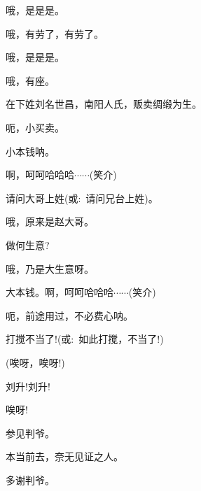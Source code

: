 {{哦，是是是。}

{哦，有劳了，有劳了。}

{哦，是是是。}

{哦，有座。}

{在下姓刘名世昌，南阳人氏，贩卖绸缎为生。}

{呃，小买卖。}

{小本钱呐。}

{啊，呵呵哈哈哈$\cdots{}\cdots{}$({\hwfs 笑介})}

{请问大哥上姓({\akai 或}:~请问兄台上姓)。}

{哦，原来是赵大哥。}

{做何生意?}

{哦，乃是大生意呀。}

{大本钱。啊，呵呵哈哈哈$\cdots{}\cdots{}$({\hwfs 笑介})}

{呃，前途用过，不必费心呐。}

{打搅不当了!({\akai 或}:~如此打搅，不当了!)}



{(唉呀，唉呀!)}



{刘升!刘升!}

{唉呀!}




\vspace{5pt}

{参见判爷。}

{本当前去，奈无见证之人。}

{多谢判爷。}

\vspace{5pt}

}
